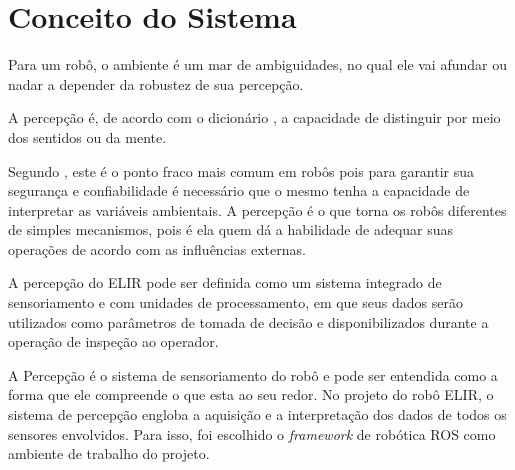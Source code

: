 \chapter{Conceito do Sistema}
\label{chap:concep}

\begin{flushright}
   \begin{list}{}{
      \setlength{\leftmargin}{4.5cm}
      \setlength{\rightmargin}{0cm}
      \setlength{\labelwidth}{0pt}
      \setlength{\labelsep}{\leftmargin}}
      \item Para um robô, o ambiente é um mar de ambiguidades, no qual ele vai afundar ou nadar a depender da robustez de sua percepção.
      \begin{list}{}{
      \setlength{\leftmargin}{0cm}
      \setlength{\rightmargin}{0cm}
      \setlength{\labelwidth}{0pt}
      \setlength{\labelsep}{\leftmargin}}
      \item \cite{Fitzpatrick}
      \end{list}
   \end{list}
\end{flushright}

A percepção é, de acordo com o dicionário , a capacidade de distinguir por meio dos sentidos ou da mente.

Segundo , este é o ponto fraco mais comum em robôs pois para garantir sua segurança e confiabilidade é necessário que o mesmo tenha a capacidade de interpretar as variáveis ambientais. A percepção é o que torna os robôs diferentes de simples mecanismos, pois é ela quem dá a habilidade de adequar suas operações de acordo com as influências externas.

A percepção do ELIR pode ser definida como um sistema integrado de sensoriamento e com unidades de processamento, em que seus dados serão utilizados como parâmetros de tomada de decisão e disponibilizados durante a operação de inspeção ao operador.

A Percepção é o sistema de sensoriamento do robô e pode ser entendida como a forma que ele compreende o que esta ao seu redor. No projeto do robô ELIR, o sistema de percepção engloba a aquisição e a interpretação dos dados de todos os sensores envolvidos. Para isso, foi escolhido o \textit{framework} de robótica ROS como ambiente de trabalho do projeto.

